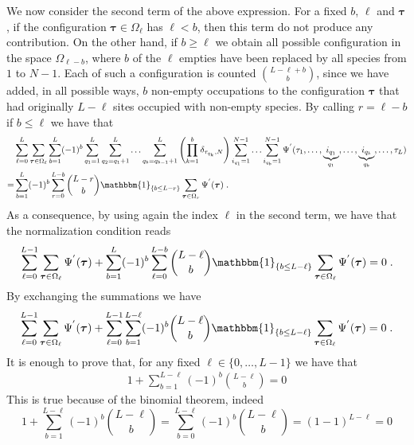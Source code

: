 \documentclass[10pt]{article}
\numberwithin{equation}{section}
\numberwithin{equation}{subsection}
\newcommand{\dt}{\;.}
\begin{document}
We now consider the second term of the above expression. For a fixed $b$, $\ell$ and $\bm{\tau}$, if the configuration $\bm{\tau}\in \Omega_{\ell}$ has $\ell<b$, then this term do not produce any contribution. On the other hand, if $b\geq \ell$ we obtain all possible configuration in the space $ \Omega_{\ell-b}$, where $b$ of the $\ell$ empties have been replaced by all  species from $1$ to $N-1$. Each of such a configuration is counted $\binom{L-\ell+b}{b}$, since we have added,  in all possible ways, $b$ non-empty occupations to the configuration $\bm{\tau}$ that had originally $L-\ell$ sites occupied with non-empty species. By calling $r=\ell-b$ if $b\leq \ell$ we have that 
\begin{align}
&\sum_{\ell=0}^{L}\sum_{\bm{\tau}\in \Omega_{\ell}}\sum_{b=1}^{L}(-1)^{b}\sum_{q_{1}=1}^{L}\sum_{q_{2}=q_{1}+1}^{L}\ldots\sum_{q_{b}=q_{b-1}+1}^{L}\left(\prod_{k=1}^{b}\delta_{\tau_{q_{k}},N}\right)\sum_{i_{q_{1}}=1}^{N-1}\ldots\sum_{i_{q_{b}}=1}^{N-1}\Psi^{'}(\tau_{1},\ldots,\underbrace{i_{q_{1}}}_{q_{1}},\ldots,\underbrace{i_{q_{b}}}_{q_{b}},\ldots,\tau_{L})\nonumber\\
=&\sum_{b=1}^{L}(-1)^{b}\sum_{r=0}^{L-b}\binom{L-r}{b}\mathbbm{1}_{\{b\leq L-r\}}\sum_{\bm{\tau}\in \Omega_{r}}\Psi^{'}(\bm{\tau})\dt
\end{align} 
As a consequence, by using again the index $\ell$ in the second term, we have that the normalization condition reads
\begin{align}
\sum_{\ell=0}^{L-1}\sum_{\bm{\tau}\in \Omega_{\ell}}\Psi^{'}(\bm{\tau})+\sum_{b=1}^{L}(-1)^{b}\sum_{\ell=0}^{L-b}\binom{L-\ell}{b}\mathbbm{1}_{\{b\leq L-\ell\}}\sum_{\bm{\tau}\in \Omega_{\ell}}\Psi^{'}(\bm{\tau})=0\dt
\end{align}
By exchanging the summations we have 
\begin{equation}
\sum_{\ell=0}^{L-1}\sum_{\bm{\tau}\in \Omega_{\ell}}\Psi^{'}(\bm{\tau})+\sum_{\ell=0}^{L-1}\sum_{b=1}^{L-\ell}(-1)^{b}\binom{L-\ell}{b}\mathbbm{1}_{\{b\leq L-\ell\}}\sum_{\bm{\tau}\in \Omega_{\ell}}\Psi^{'}(\bm{\tau})=0\dt
\end{equation}
It is enough to prove that, for any fixed $\ell\in\{0,\ldots, L-1\}$ we have that 
\begin{align}
	1+\sum_{b=1}^{L-\ell}(-1)^{b}\binom{L-\ell}{b}=0
\end{align}
This is true because of the binomial theorem, indeed 
\begin{equation}
1+\sum_{b=1}^{L-\ell}(-1)^{b}\binom{L-\ell}{b}=\sum_{b=0}^{L-\ell}(-1)^{b}\binom{L-\ell}{b}=(1-1)^{L-\ell}=0
\end{equation}
\end{document}
